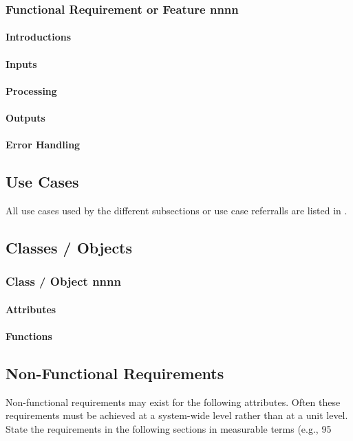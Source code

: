\documentclass[a4paper]{article}
\begin{document}
\subsubsection{Functional Requirement or Feature nnnn}
\paragraph{Introductions}
\paragraph{Inputs}
\paragraph{Processing}
\paragraph{Outputs}
\paragraph{Error Handling}

\subsection{Use Cases}
All use cases used by the different subsections or use case referralls are listed in \cite{Dragonfly-UC}. 

\subsection{Classes / Objects}
\subsubsection{Class / Object  nnnn}
\paragraph{Attributes}
\paragraph{Functions}

\subsection{Non-Functional Requirements}
Non-functional requirements may exist for the following attributes.  Often these requirements must be achieved at a system-wide level rather than at a unit level.  State the requirements in the following sections in measurable terms (e.g., 95%
\end{document}
